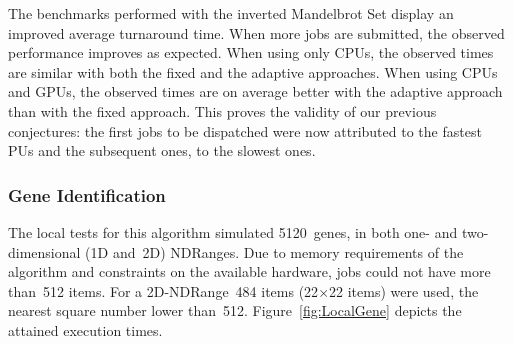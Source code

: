 \documentclass[runningheads,a4paper]{llncs}
\begin{document}



The benchmarks performed with the inverted Mandelbrot Set display an improved average turnaround time. When more jobs are submitted, the observed performance improves as expected. When using only CPUs, the observed times are similar with both the fixed and the adaptive approaches. When using CPUs and GPUs, the observed times are on average better with the adaptive approach than with the fixed approach.
This proves the validity of our previous conjectures: the first jobs to be dispatched were now attributed to the fastest PUs and the subsequent ones, to the slowest ones. %




\subsubsection{Gene Identification}
\label{subsub:gene_identification}

%

The local tests for this algorithm simulated 5120~genes, in both one- and two-dimensional (1D and~2D) NDRanges. Due to memory requirements of the algorithm and constraints on the available hardware, jobs could not have more than~512 items. For a 2D-NDRange~484 items (22$\times$22 items) were used, the nearest square number lower than~512. Figure~\ref{fig:LocalGene} depicts the attained execution times.
\end{document}
